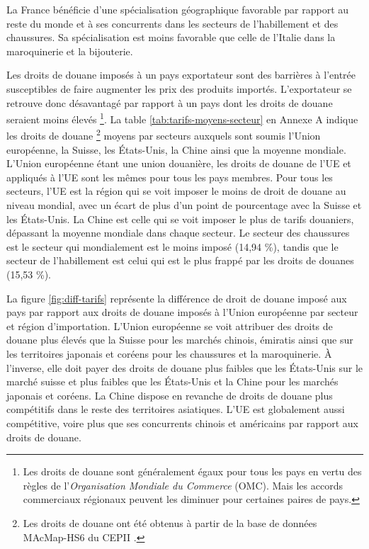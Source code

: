 \documentclass[french,10pt,a4paper]{article}
\begin{document}
\bigskip

La France bénéficie d'une spécialisation géographique favorable par rapport au reste du monde et à ses concurrents dans les secteurs de l'habillement et des chaussures. Sa spécialisation est moins favorable que celle de l'Italie dans la maroquinerie et la bijouterie.


\begin{tcolorbox}[title=Encadré 1 : Droits de douane]
  \small
  Les droits de douane imposés à un pays exportateur sont des barrières à l'entrée susceptibles de faire augmenter les prix des produits importés. L'exportateur se retrouve donc désavantagé par rapport à un pays dont les droits de douane seraient moins élevés \footnote{Les droits de douane sont généralement égaux pour tous les pays en vertu des règles de l'\textit{Organisation Mondiale du Commerce} (OMC). Mais les accords commerciaux régionaux peuvent les diminuer pour certaines paires de pays.}. La table \ref{tab:tarifs-moyens-secteur} en Annexe A indique les droits de douane \footnote{Les droits de douane ont été obtenus à partir de la base de données MAcMap-HS6 du CEPII \citep{Guimbard2012}.} moyens par secteurs auxquels sont soumis l'Union européenne, la Suisse, les États-Unis, la Chine ainsi que la moyenne mondiale. L'Union européenne étant une union douanière, les droits de douane de l'UE et appliqués à l'UE sont les mêmes pour tous les pays membres. Pour tous les secteurs, l'UE est la région qui se voit imposer le moins de droit de douane au niveau mondial, avec un écart de plus d'un point de pourcentage avec la Suisse et les États-Unis. La Chine est celle qui se voit imposer le plus de tarifs douaniers, dépassant la moyenne mondiale dans chaque secteur. Le secteur des chaussures est le secteur qui mondialement est le moins imposé (14,94 \%), tandis que le secteur de l'habillement est celui qui est le plus frappé par les droits de douanes (15,53 \%).

  \medskip
  
  La figure \ref{fig:diff-tarifs} représente la différence de droit de douane imposé aux pays par rapport aux droits de douane imposés à l'Union européenne par secteur et région d'importation. L'Union européenne se voit attribuer des droits de douane plus élevés que la Suisse pour les marchés chinois, émiratis ainsi que sur les territoires japonais et coréens pour les chaussures et la maroquinerie. À l'inverse, elle doit payer des droits de douane plus faibles que les États-Unis sur le marché suisse et plus faibles que les États-Unis et la Chine pour les marchés japonais et coréens. La Chine dispose en revanche de droits de douane plus compétitifs dans le reste des territoires asiatiques. L'UE est globalement aussi compétitive, voire plus que ses concurrents chinois et américains par rapport aux droits de douane.


\end{tcolorbox}
\end{document}
